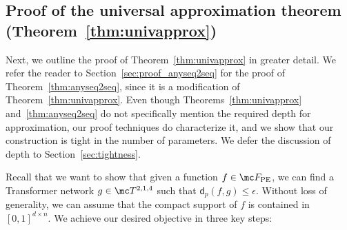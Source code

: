 \documentclass{article} %
\newcommand{\funcdist}{\mathsf{d}}
\begin{document}



\vspace*{-5pt}
\subsection{Proof of the universal approximation theorem (Theorem~\ref{thm:univapprox})}
\vspace*{-4pt}
\label{sec:proof-univapprox}

Next, we outline the proof of Theorem~\ref{thm:univapprox} in greater detail. We refer the reader to Section~\ref{sec:proof_anyseq2seq} for the proof of Theorem~\ref{thm:anyseq2seq}, since it is a modification of Theorem~\ref{thm:univapprox}. Even though Theorems~\ref{thm:univapprox} and~\ref{thm:anyseq2seq} do not specifically mention the required depth for approximation, our proof techniques do characterize it, and we show that our construction is tight in the number of parameters. We defer the discussion of depth to Section~\ref{sec:tightness}.

Recall that we want to show that given a function $f \in \mc F_{\rm PE}$, we can find a Transformer network $g \in \mc T^{2,1,4}$ such that $\funcdist_p(f, g) \leq \epsilon$. Without loss of generality, we can assume that the compact support of $f$ is contained in $[0, 1]^{d \times n}$. We achieve our desired objective in three key steps:
\end{document}
